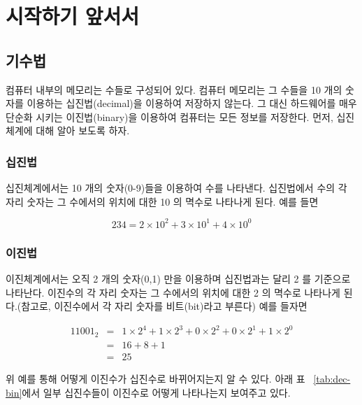﻿%

\chapter{시작하기 앞서서}
\section{기수법}
컴퓨터 내부의 메모리는 수들로 구성되어 있다. 컴퓨터 메모리는 그 수들을 
10 개의 숫자를 이용하는 십진법(decimal)을 이용하여 저장하지 않는다. 그 대신 
하드웨어를 매우 단순화 시키는 이진법(binary)을 이용하여 컴퓨터는 모든 정보를
저장한다. 먼저, 십진 체계에 대해 알아 보도록 하자.

\subsection{십진법}

십진체계에서는 10 개의 숫자(0-9)들을 이용하여 수를 나타낸다. 십진법에서 수의 각 자리
숫자는 그 수에서의 위치에 대한 10 의 멱수로 나타나게 된다. 예를 들면

\begin{displaymath}
234 = 2 \times 10^2 + 3 \times 10^1 + 4 \times 10^0
\end{displaymath}

\subsection{이진법}

이진체계에서는 오직 2 개의 숫자(0,1) 만을 이용하며 십진법과는 달리 2 를 기준으로 나타난다.
이진수의 각 자리 숫자는 그 수에서의 위치에 대한 2 의 멱수로 나타나게 된다.(참고로, 
이진수에서 각 자리 숫자를 비트(bit)라고 부른다) 예를 들자면 

\begin{eqnarray*}
11001_2 & = & 1 \times 2^4 + 1 \times 2^3 + 0 \times 2^2 + 0 \times 2^1 
             + 1 \times 2^0 \\
& = & 16 + 8 + 1 \\
& = & 25 
\end{eqnarray*}

위 예를 통해 어떻게 이진수가 십진수로 바뀌어지는지 알 수 있다. 아래 표 ~\ref{tab:dec-bin}에서 일부 십진수들이
이진수로 어떻게 나타나는지 보여주고 있다. 

